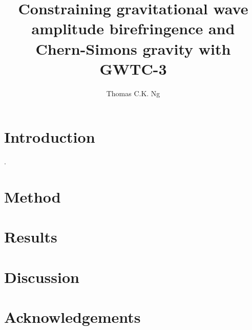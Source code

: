 \documentclass[twocolumn]{aastex631}
\begin{document}
\title{Constraining gravitational wave amplitude birefringence and Chern-Simons gravity with GWTC-3}

\author{Thomas C.K. Ng}

\begin{abstract}
    
\end{abstract}

\section{Introduction}

\citep{Maria_2021}.

\section{Method}



\section{Results}



\section{Discussion}



\section{Acknowledgements}




\end{document}

